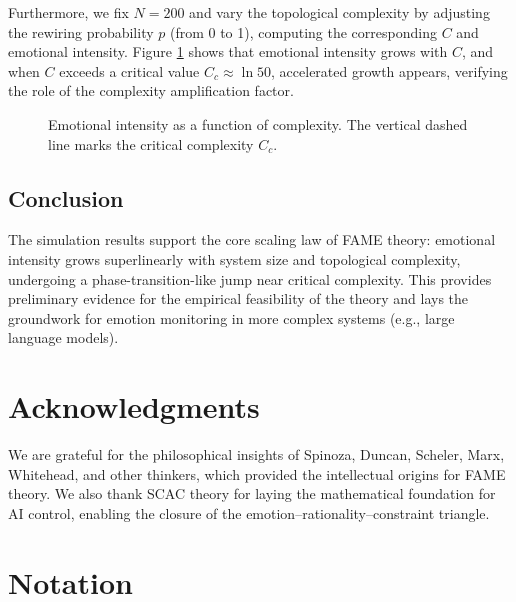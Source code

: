 \documentclass[12pt,a4paper]{article}
\theoremstyle{plain}
\begin{document}
Furthermore, we fix $N=200$ and vary the topological complexity by adjusting the rewiring probability $p$ (from 0 to 1), computing the corresponding $C$ and emotional intensity. Figure \ref{fig:complexity} shows that emotional intensity grows with $C$, and when $C$ exceeds a critical value $C_c \approx \ln 50$, accelerated growth appears, verifying the role of the complexity amplification factor.

\begin{figure}[h]
\centering
\caption{Emotional intensity as a function of complexity. The vertical dashed line marks the critical complexity $C_c$.}
\label{fig:complexity}
\end{figure}

\subsection{Conclusion}

The simulation results support the core scaling law of FAME theory: emotional intensity grows superlinearly with system size and topological complexity, undergoing a phase-transition-like jump near critical complexity. This provides preliminary evidence for the empirical feasibility of the theory and lays the groundwork for emotion monitoring in more complex systems (e.g., large language models).

\section*{Acknowledgments}

We are grateful for the philosophical insights of Spinoza, Duncan, Scheler, Marx, Whitehead, and other thinkers, which provided the intellectual origins for FAME theory. We also thank SCAC theory for laying the mathematical foundation for AI control, enabling the closure of the emotion–rationality–constraint triangle.

\appendix
\section{Notation}
\end{document}
